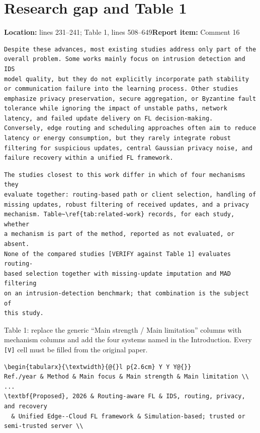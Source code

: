 \documentclass[10pt,a4paper]{article}
\newcommand{\issue}[3]{\section{#1}{\raggedright\noindent\textcolor{note}{\small\textbf{Location:} #2\quad\textbf{Report item:} #3}\par}\smallskip}
\newcommand{\why}[1]{\noindent\textcolor{note}{\small #1}\par\smallskip}
\begin{document}
\issue{Research gap and Table 1}{lines 231--241; Table 1, lines 508--649}{Comment 16}

\begin{before}[lines 231--241]
\begin{Verbatim}
Despite these advances, most existing studies address only part of the
overall problem. Some works mainly focus on intrusion detection and IDS
model quality, but they do not explicitly incorporate path stability
or communication failure into the learning process. Other studies
emphasize privacy preservation, secure aggregation, or Byzantine fault
tolerance while ignoring the impact of unstable paths, network
latency, and failed update delivery on FL decision-making.
Conversely, edge routing and scheduling approaches often aim to reduce
latency or energy consumption, but they rarely integrate robust
filtering for suspicious updates, central Gaussian privacy noise, and
failure recovery within a unified FL framework.
\end{Verbatim}
\end{before}

\begin{after}
\begin{Verbatim}
The studies closest to this work differ in which of four mechanisms they
evaluate together: routing-based path or client selection, handling of
missing updates, robust filtering of received updates, and a privacy
mechanism. Table~\ref{tab:related-work} records, for each study, whether
a mechanism is part of the method, reported as not evaluated, or absent.
None of the compared studies [VERIFY against Table 1] evaluates routing-
based selection together with missing-update imputation and MAD filtering
on an intrusion-detection benchmark; that combination is the subject of
this study.
\end{Verbatim}
\end{after}

\why{Table 1: replace the generic ``Main strength / Main limitation'' columns with mechanism columns and add the four systems named in the Introduction. Every \texttt{[V]} cell must be filled from the original paper.}

\begin{before}
\begin{Verbatim}
\begin{tabularx}{\textwidth}{@{}l p{2.6cm} Y Y Y@{}}
Ref./year & Method & Main focus & Main strength & Main limitation \\
...
\textbf{Proposed}, 2026 & Routing-aware FL & IDS, routing, privacy, and recovery
  & Unified Edge--Cloud FL framework & Simulation-based; trusted or semi-trusted server \\
\end{Verbatim}
\end{before}
\end{document}
